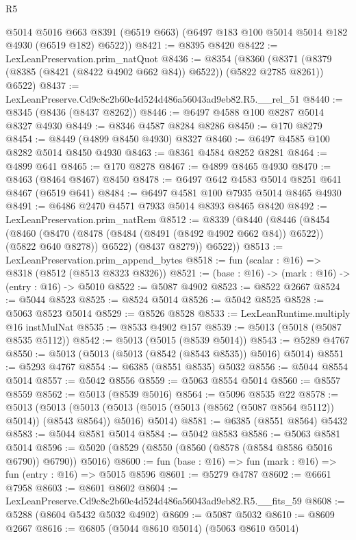 \begin{lexlean}{R5}
\begin{coremodule}
      @5014
      @5016
      @663
      @8391
      (@6519 @663)
      (@6497 @183 @100 @5014 @5014 @182 @4930 (@6519 @182) @6522))
@8421 := @8395 @8420
@8422 := LexLeanPreservation.prim_natQuot
@8436 := @8354
    (@8360 (@8371 (@8379 (@8385 (@8421 (@8422 @4902 @662 @84)) @6522)) (@5822 @2785 @8261)) @6522)
@8437 := LexLeanPreserve.Cd9c8c2b60c4d524d486a56043ad9eb82.R5.__rel_51
@8440 := @8345 (@8436 (@8437 @8262))
@8446 := @6497 @4588 @100 @8287 @5014 @8327 @4930
@8449 := @8346 @4587 @8284 @8286
@8450 := @170 @8279
@8454 := @8449 (@4899 @8450 @4930) @8327
@8460 := @6497 @4585 @100 @8282 @5014 @8450 @4930
@8463 := @8361 @4584 @8252 @8281
@8464 := @4899 @641
@8465 := @170 @8278
@8467 := @4899 @8465 @4930
@8470 := @8463 (@8464 @8467) @8450
@8478 := @6497 @642 @4583 @5014 @8251 @641 @8467 (@6519 @641)
@8484 := @6497 @4581 @100 @7935 @5014 @8465 @4930
@8491 := @6486 @2470 @4571 @7933 @5014 @8393 @8465 @8420
@8492 := LexLeanPreservation.prim_natRem
@8512 := @8339
    (@8440
      (@8446
        (@8454
          (@8460
            (@8470 (@8478 (@8484 (@8491 (@8492 @4902 @662 @84)) @6522)) (@5822 @640 @8278))
            @6522)
          (@8437 @8279))
        @6522))
@8513 := LexLeanPreservation.prim_append_bytes
@8518 := fun (scalar : @16) => @8318 (@8512 (@8513 @8323 @8326))
@8521 := (base : @16) -> (mark : @16) -> (entry : @16) -> @5010
@8522 := @5087 @4902
@8523 := @8522 @2667
@8524 := @5044 @8523
@8525 := @8524 @5014
@8526 := @5042 @8525
@8528 := @5063 @8523 @5014
@8529 := @8526 @8528
@8533 := LexLeanRuntime.multiply @16 instMulNat
@8535 := @8533 @4902 @157
@8539 := @5013 (@5018 (@5087 @8535 @5112))
@8542 := @5013 (@5015 (@8539 @5014))
@8543 := @5289 @4767
@8550 := @5013 (@5013 (@5013 (@8542 (@8543 @8535)) @5016) @5014)
@8551 := @5293 @4767
@8554 := @6385 (@8551 @8535) @5032
@8556 := @5044 @8554 @5014
@8557 := @5042 @8556
@8559 := @5063 @8554 @5014
@8560 := @8557 @8559
@8562 := @5013 (@8539 @5016)
@8564 := @5096 @8535 @22
@8578 := @5013
    (@5013
      (@5013 (@5013 (@5015 (@5013 (@8562 (@5087 @8564 @5112)) @5014)) (@8543 @8564)) @5016)
      @5014)
@8581 := @6385 (@8551 @8564) @5432
@8583 := @5044 @8581 @5014
@8584 := @5042 @8583
@8586 := @5063 @8581 @5014
@8596 := @5020 (@8529 (@8550 (@8560 (@8578 (@8584 @8586 @5016 @6790)) @6790)) @5016)
@8600 := fun (base : @16) => fun (mark : @16) => fun (entry : @16) => @5015 @8596
@8601 := @5279 @4787
@8602 := @6661 @7958
@8603 := @8601 @8602
@8604 := LexLeanPreserve.Cd9c8c2b60c4d524d486a56043ad9eb82.R5.__fits_59
@8608 := @5288 (@8604 @5432 @5032 @4902)
@8609 := @5087 @5032
@8610 := @8609 @2667
@8616 := @6805 (@5044 @8610 @5014) (@5063 @8610 @5014)

\end{coremodule}
\end{lexlean}
